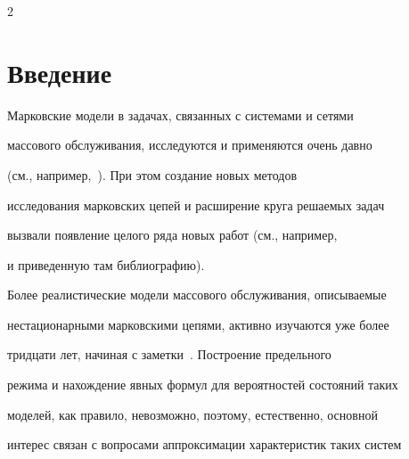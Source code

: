 









      \thispagestyle{headings}





      \begin{multicols}{2}





      \label{st\stat}





\section{Введение}





Марковские модели в задачах, связанных с сис\-те\-ма\-ми и сетями


массового обслуживания, исследуются и применяются очень давно


(см., например,~\cite{bha, bp}). При этом создание новых методов\linebreak


исследования марковских цепей  и расширение круга решаемых задач


вызвали появление целого ряда новых работ (см., например,~\cite{cn}


и приведенную там библиографию).





Более реалистические модели массового обслу\-живания, описываемые


нестационарными мар\-ковскими цепями, активно изучаются уже более


три\-дца\-ти лет, начиная с заметки~\cite{gm}. Построение предельного


режима и нахождение явных формул для вероятностей состояний таких


моделей, как правило, невозможно, поэтому, естественно, основной


интерес связан с вопросами аппроксимации характеристик таких систем



\end{multicols}
